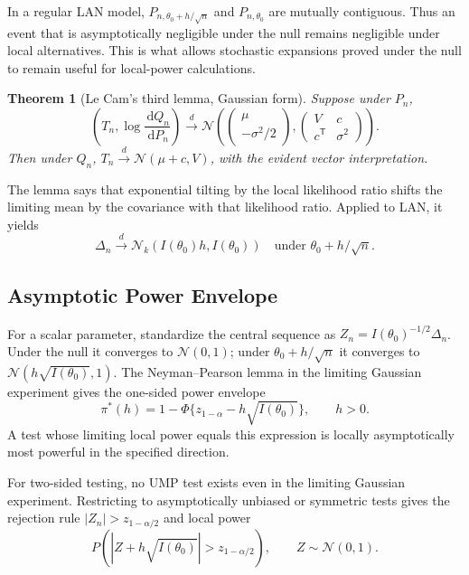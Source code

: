\documentclass[12pt,oneside]{book}
\numberwithin{equation}{section}
\theoremstyle{definition}
\theoremstyle{plain}
\newtheorem{theorem}{Theorem}[section]
\theoremstyle{remark}
\newcommand{\convd}{\overset{d}{\to}}
\newcommand{\abs}[1]{\left\lvert #1 \right\rvert}
\newcommand{\dd}{\,\mathrm{d}}
\newcommand{\Normal}{\mathcal{N}}
\begin{document}
In a regular LAN model, $P_{n,\theta_0+h/\sqrt n}$ and
$P_{n,\theta_0}$ are mutually contiguous.  Thus an event that is asymptotically
negligible under the null remains negligible under local alternatives.  This
is what allows stochastic expansions proved under the null to remain useful
for local-power calculations.

\begin{theorem}[Le Cam's third lemma, Gaussian form]
Suppose under $P_n$,
\[
 \left(T_n,\log\frac{\dd Q_n}{\dd P_n}\right)
 \convd \Normal\left(
 \begin{pmatrix}\mu\\-\sigma^2/2\end{pmatrix},
 \begin{pmatrix}V&c\\c^\mathsf T&\sigma^2\end{pmatrix}
 \right).
\]
Then under $Q_n$, $T_n\convd\Normal(\mu+c,V)$, with the evident vector
interpretation.
\end{theorem}

The lemma says that exponential tilting by the local likelihood ratio shifts
the limiting mean by the covariance with that likelihood ratio.  Applied to
LAN, it yields
\begin{equation}
    \Delta_n\convd
    \Normal_k(I(\theta_0)h,I(\theta_0))
    \quad\text{under }\theta_0+h/\sqrt n.
    \label{eq:score-under-local}
\end{equation}

\subsection{Asymptotic Power Envelope}

For a scalar parameter, standardize the central sequence as
$Z_n=I(\theta_0)^{-1/2}\Delta_n$.  Under the null it converges to
$\Normal(0,1)$; under $\theta_0+h/\sqrt n$ it converges to
$\Normal(h\sqrt{I(\theta_0)},1)$.  The Neyman--Pearson lemma in the limiting
Gaussian experiment gives the one-sided power envelope
\begin{equation}
    \pi^*(h)=1-\Phi\{z_{1-\alpha}-h\sqrt{I(\theta_0)}\},
    \qquad h>0.
    \label{eq:local-power-envelope}
\end{equation}
A test whose limiting local power equals this expression is locally
asymptotically most powerful in the specified direction.

For two-sided testing, no UMP test exists even in the limiting Gaussian
experiment.  Restricting to asymptotically unbiased or symmetric tests gives
the rejection rule $\abs{Z_n}>z_{1-\alpha/2}$ and local power
\[
 P\left(\abs{Z+h\sqrt{I(\theta_0)}}>z_{1-\alpha/2}\right),
 \qquad Z\sim\Normal(0,1).
\]
\end{document}
